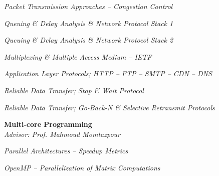 \documentclass[margin, 10pt]{res} %
\begin{document}
\begin{resume}
\begin{innerlist}
			\item \textit{Packet Transmission Approaches -- Congestion Control} \href{https://github.com/aligholamee/Compnets/raw/master/docs/assignment-2/compnet_assignment_2_9531504.pdf}{\hfill\UrlFont[docs]}

			\item \textit{Queuing \& Delay Analysis \& Network Protocol Stack 1} \href{https://github.com/aligholamee/Compnets/raw/master/docs/assignment-3/compnet_assignment_3_9531504.pdf}{\hfill\UrlFont[docs]}
			
			\item \textit{Queuing \& Delay Analysis \& Network Protocol Stack 2} \href{https://github.com/aligholamee/Compnets/raw/master/docs/assignment-4/compnet_assignment_4_9531504.pdf}{\hfill\UrlFont[docs]}
			
			\item \textit{Multiplexing \& Multiple Access Medium -- IETF} \href{https://github.com/aligholamee/Compnets/raw/master/docs/assignment-5/compnet_assignment_5_9531504.pdf}{\hfill\UrlFont[docs]}
			
			\item \textit{Application Layer Protocols; HTTP -- FTP -- SMTP -- CDN -- DNS} \href{https://github.com/aligholamee/Compnets/raw/master/docs/assignment-6/compnet_assignment_6_9531504.pdf}{\hfill\UrlFont[docs]}
			
			
			\item \textit{Reliable Data Transfer; Stop \& Wait Protocol} \href{https://github.com/aligholamee/Compnets/raw/master/docs/assignment-8/compnet_assignment_8_9531504.pdf}{\hfill\UrlFont[docs]}
			
			\item \textit{Reliable Data Transfer; Go-Back-N \& Selective Retransmit Protocols} \href{https://github.com/aligholamee/Compnets/raw/master/docs/assignment-8/compnet_assignment_8_9531504.pdf}{\hfill\UrlFont[docs]}
		\end{innerlist}
	
        \textbf{Multi-core Programming}\\
			\textit{Advisor: Prof. Mahmoud Momtazpour}
			\begin{innerlist}
				\item \textit{Parallel Architectures -- Speedup Metrics} \href{https://github.com/aligholamee/Parallax/raw/master/docs/assignment-1/MCP_9531504_HW1.pdf}{\hfill\UrlFont[docs]}
				
				\item \textit{OpenMP -- Parallelization of Matrix Computations} \href{https://github.com/aligholamee/Parallax/raw/master/docs/assignment-2/MCP_9531504_HW2.pdf}{\hfill\UrlFont[docs]}
				

\end{innerlist}
\end{resume}
\end{document}
